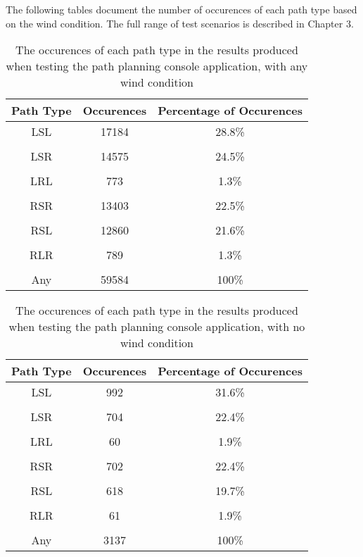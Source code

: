 \chapter{} 
\label{app:RollResults}

\graphicspath{{Appendix6/Figs/}}

The following tables document the number of occurences of each path type based on the wind condition. The full range of test scenarios is described in Chapter 3.

\begin{table}[h!]
\centering
\caption{The occurences of each path type in the results produced when testing the path planning console application, with any wind condition}
 \begin{tabular}{c | c | c}
	\hline
	\textbf{Path Type} & \textbf{Occurences} & \textbf{Percentage of Occurences}\\
	\hline
	\hline
	LSL & 17184 & 28.8\%\\	
	\\
	LSR & 14575 & 24.5\%\\
	\\
	LRL & 773 & 1.3\%\\
	\\
	RSR & 13403 & 22.5\%\\
	\\
	RSL & 12860 & 21.6\%\\
	\\
	RLR & 789 & 1.3\%\\
	\\
	Any & 59584 & 100\%\\
	\hline
 \end{tabular}
\end{table}


\begin{table}[h!]
\centering
\caption{The occurences of each path type in the results produced when testing the path planning console application, with no wind condition}
 \begin{tabular}{c | c | c}
	\hline
	\textbf{Path Type} & \textbf{Occurences} & \textbf{Percentage of Occurences}\\
	\hline
	\hline
	LSL & 992 & 31.6\%\\
	\\
	LSR & 704 & 22.4\%\\
	\\
	LRL & 60 & 1.9\%\\
	\\
	RSR & 702 & 22.4\%\\  
	\\
	RSL & 618 & 19.7\%\\
	\\
	RLR & 61 & 1.9\%\\
	\\
	Any & 3137 & 100\%\\
	\hline
 \end{tabular}
\end{table}


